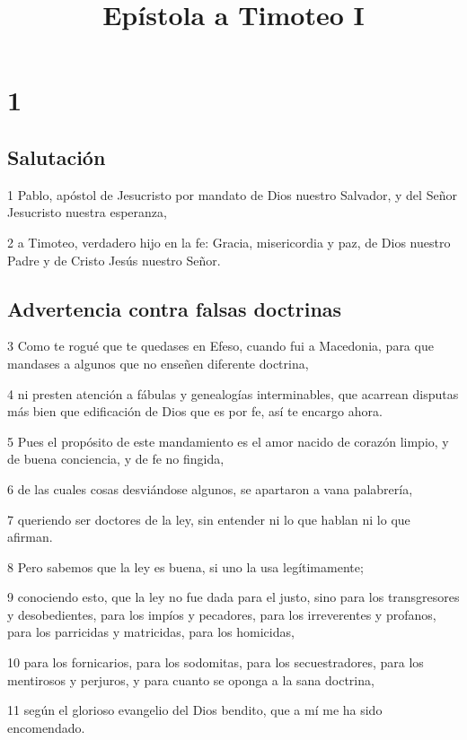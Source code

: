 
\title{Epístola a Timoteo I}

\chapter{1}

\section*{Salutación}

\par 1 Pablo, apóstol de Jesucristo por mandato de Dios nuestro Salvador, y del Señor Jesucristo nuestra esperanza,
\par 2 a Timoteo, verdadero hijo en la fe: Gracia, misericordia y paz, de Dios nuestro Padre y de Cristo Jesús nuestro Señor.

\section*{Advertencia contra falsas doctrinas}

\par 3 Como te rogué que te quedases en Efeso, cuando fui a Macedonia, para que mandases a algunos que no enseñen diferente doctrina,
\par 4 ni presten atención a fábulas y genealogías interminables, que acarrean disputas más bien que edificación de Dios que es por fe, así te encargo ahora.
\par 5 Pues el propósito de este mandamiento es el amor nacido de corazón limpio, y de buena conciencia, y de fe no fingida,
\par 6 de las cuales cosas desviándose algunos, se apartaron a vana palabrería,
\par 7 queriendo ser doctores de la ley, sin entender ni lo que hablan ni lo que afirman.
\par 8 Pero sabemos que la ley es buena, si uno la usa legítimamente;
\par 9 conociendo esto, que la ley no fue dada para el justo, sino para los transgresores y desobedientes, para los impíos y pecadores, para los irreverentes y profanos, para los parricidas y matricidas, para los homicidas,
\par 10 para los fornicarios, para los sodomitas, para los secuestradores, para los mentirosos y perjuros, y para cuanto se oponga a la sana doctrina,
\par 11 según el glorioso evangelio del Dios bendito, que a mí me ha sido encomendado.

